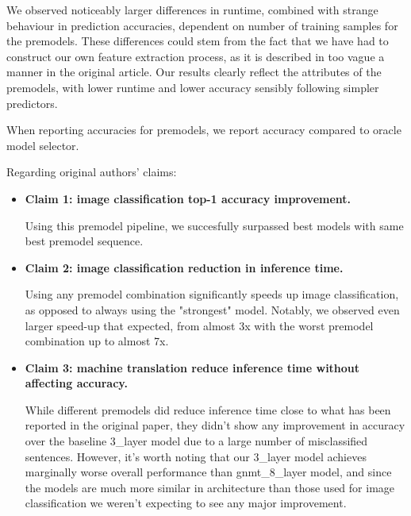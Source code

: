 We observed noticeably larger differences in runtime, combined with strange behaviour in prediction accuracies, dependent on number of training samples for the premodels. These differences could stem from the fact that we have had to construct our own feature extraction process, as it is described in too vague a manner in the original article. Our results clearly reflect the attributes of the premodels, with lower runtime and lower accuracy sensibly following simpler predictors.

When reporting accuracies for premodels, we report accuracy compared to oracle model selector.

Regarding original authors' claims:
\begin{itemize}
  \item \textbf{Claim 1: image classification top-1 accuracy improvement.}

        Using this premodel pipeline, we succesfully surpassed best models with same best premodel sequence.

  \item \textbf{Claim 2: image classification reduction in inference time.}

        Using any premodel combination significantly speeds up image classification, as opposed to always using the "strongest" model. Notably, we observed even larger speed-up that expected, from almost 3x with the worst premodel combination up to almost 7x.

  \item \textbf{Claim 3: machine translation reduce inference time without affecting accuracy.}

        While different premodels did reduce inference time close to what has been reported in the original paper, they didn't show any improvement in accuracy over the baseline 3\_layer model due to a large number of misclassified sentences. However, it's worth noting that our 3\_layer model achieves marginally worse overall performance than gnmt\_8\_layer model, and since the models are much more similar in architecture than those used for image classification we weren't expecting to see any major improvement.

\end{itemize}




